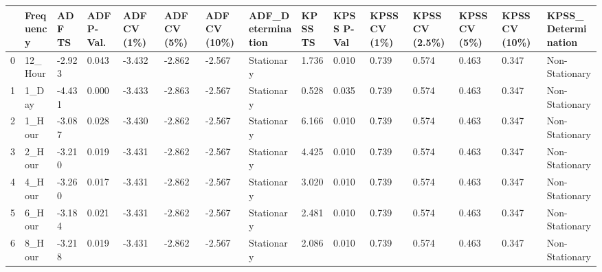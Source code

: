 \begin{tabular}{lllllllllllllll}
\toprule
 & Frequency & ADF TS & ADF P-Val. & ADF CV (1\%) & ADF CV (5\%) & ADF CV (10\%) & ADF_Determination & KPSS TS & KPSS P-Val & KPSS CV (1\%) & KPSS CV (2.5\%) & KPSS CV (5\%) & KPSS CV (10\%) & KPSS_Determination \\
\midrule
0 & 12_Hour & -2.923 & 0.043 & -3.432 & -2.862 & -2.567 & Stationary & 1.736 & 0.010 & 0.739 & 0.574 & 0.463 & 0.347 & Non-Stationary \\
1 & 1_Day & -4.431 & 0.000 & -3.433 & -2.863 & -2.567 & Stationary & 0.528 & 0.035 & 0.739 & 0.574 & 0.463 & 0.347 & Non-Stationary \\
2 & 1_Hour & -3.087 & 0.028 & -3.430 & -2.862 & -2.567 & Stationary & 6.166 & 0.010 & 0.739 & 0.574 & 0.463 & 0.347 & Non-Stationary \\
3 & 2_Hour & -3.210 & 0.019 & -3.431 & -2.862 & -2.567 & Stationary & 4.425 & 0.010 & 0.739 & 0.574 & 0.463 & 0.347 & Non-Stationary \\
4 & 4_Hour & -3.260 & 0.017 & -3.431 & -2.862 & -2.567 & Stationary & 3.020 & 0.010 & 0.739 & 0.574 & 0.463 & 0.347 & Non-Stationary \\
5 & 6_Hour & -3.184 & 0.021 & -3.431 & -2.862 & -2.567 & Stationary & 2.481 & 0.010 & 0.739 & 0.574 & 0.463 & 0.347 & Non-Stationary \\
6 & 8_Hour & -3.218 & 0.019 & -3.431 & -2.862 & -2.567 & Stationary & 2.086 & 0.010 & 0.739 & 0.574 & 0.463 & 0.347 & Non-Stationary \\
\bottomrule
\end{tabular}
